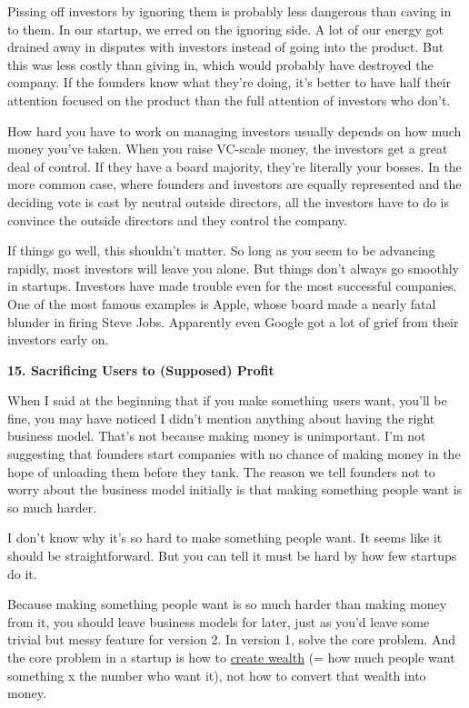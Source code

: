 \documentclass[12pt]{book}
\begin{document}
Pissing off investors by ignoring them is probably less dangerous than
caving in to them. In our startup, we erred on the ignoring side. A lot
of our energy got drained away in disputes with investors instead of
going into the product. But this was less costly than giving in, which
would probably have destroyed the company. If the founders know what
they're doing, it's better to have half their attention focused on the
product than the full attention of investors who don't.

How hard you have to work on managing investors usually depends on how
much money you've taken. When you raise VC-scale money, the investors
get a great deal of control. If they have a board majority, they're
literally your bosses. In the more common case, where founders and
investors are equally represented and the deciding vote is cast by
neutral outside directors, all the investors have to do is convince the
outside directors and they control the company.

If things go well, this shouldn't matter. So long as you seem to be
advancing rapidly, most investors will leave you alone. But things don't
always go smoothly in startups. Investors have made trouble even for the
most successful companies. One of the most famous examples is Apple,
whose board made a nearly fatal blunder in firing Steve Jobs. Apparently
even Google got a lot of grief from their investors early on.

\textbf{15. Sacrificing Users to (Supposed) Profit}

When I said at the beginning that if you make something users want,
you'll be fine, you may have noticed I didn't mention anything about
having the right business model. That's not because making money is
unimportant. I'm not suggesting that founders start companies with no
chance of making money in the hope of unloading them before they tank.
The reason we tell founders not to worry about the business model
initially is that making something people want is so much harder.

I don't know why it's so hard to make something people want. It seems
like it should be straightforward. But you can tell it must be hard by
how few startups do it.

Because making something people want is so much harder than making money
from it, you should leave business models for later, just as you'd leave
some trivial but messy feature for version 2. In version 1, solve the
core problem. And the core problem in a startup is how to
\href{wealth.html}{create wealth} (= how much people want something x
the number who want it), not how to convert that wealth into money.
\end{document}

